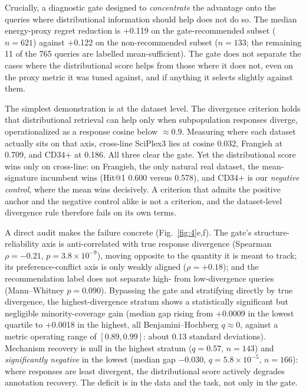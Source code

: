 \documentclass[11pt,letterpaper]{article}
\begin{document}
Crucially, a diagnostic gate designed to \textit{concentrate} the advantage onto the
queries where distributional information should help does not do so. The median
energy-proxy regret reduction is $+$0.119 on the gate-recommended subset ($n = 621$)
against $+$0.122 on the non-recommended subset ($n = 133$; the remaining 11 of the 765
queries are labelled mean-sufficient). The gate does not separate the cases where the
distributional score helps from those where it does not, even on the proxy metric it was tuned
against, and if anything it selects slightly against them.

The simplest demonstration is at the dataset level. The divergence criterion holds that
distributional retrieval can help only when subpopulation responses diverge,
operationalized as a response cosine below $\approx$0.9. Measuring where each dataset
actually sits on that axis, cross-line SciPlex3 lies at cosine 0.032, Frangieh
at 0.709, and CD34$+$ at 0.186. All three clear the gate. Yet the distributional score wins
only on cross-line: on Frangieh, the only natural real dataset, the mean-signature
incumbent wins (Hit@1 0.600 versus 0.578), and CD34$+$ is our \emph{negative control},
where the mean wins decisively. A criterion that admits the positive anchor and
the negative control alike is not a criterion, and the dataset-level divergence rule
therefore fails on its own terms.

A direct audit makes the failure concrete (Fig.~\ref{fig:4}e,f). The gate's
structure-reliability axis is anti-correlated with true response divergence (Spearman
$\rho = -0.21$, $p = 3.8\times10^{-9}$), moving opposite to the quantity it is meant to track;
its preference-conflict axis is only weakly aligned ($\rho = +0.18$); and the recommendation
label does not separate high- from low-divergence queries (Mann--Whitney $p = 0.090$).
Bypassing the gate and stratifying directly by true divergence, the highest-divergence stratum
shows a statistically significant but negligible minority-coverage gain (median gap rising from
$+$0.0009 in the lowest quartile to $+$0.0018 in the highest, all Benjamini--Hochberg
$q \approx 0$, against a metric operating range of $[0.89, 0.99]$: about 0.13 standard
deviations). Mechanism recovery is null in the highest stratum ($q = 0.57$, $n = 143$) and
\emph{significantly negative} in the lowest (median gap $-$0.030, $q = 5.8\times10^{-5}$,
$n = 166$): where responses are least divergent, the distributional score actively degrades annotation
recovery.
The deficit is in the data and the task, not only in the gate.
\end{document}
